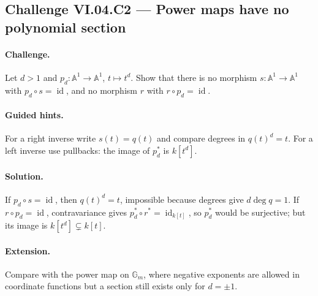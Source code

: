 \subsection*{Challenge VI.04.C2 --- Power maps have no polynomial section}
\label{chal:vi04-c2}
\paragraph{Challenge.}
Let \(d>1\) and \(p_d:\mathbb A^1\to\mathbb A^1\), \(t\mapsto t^d\).  Show that there is
no morphism \(s:\mathbb A^1\to\mathbb A^1\) with \(p_d\circ s=\operatorname{id}\), and no
morphism \(r\) with \(r\circ p_d=\operatorname{id}\).
\ifdefined\FullProblemDossiers
\paragraph{Guided hints.}  For a right inverse write \(s(t)=q(t)\) and compare degrees in
\(q(t)^d=t\).  For a left inverse use pullbacks: the image of \(p_d^*\) is \(k[t^d]\).
\paragraph{Solution.}
If \(p_d\circ s=\operatorname{id}\), then \(q(t)^d=t\), impossible because degrees give
\(d\deg q=1\).  If \(r\circ p_d=\operatorname{id}\), contravariance gives
\(p_d^*\circ r^*=\operatorname{id}_{k[t]}\), so \(p_d^*\) would be surjective; but its
image is \(k[t^d]\subsetneq k[t]\).
\paragraph{Extension.}  Compare with the power map on \(\mathbb G_m\), where negative
exponents are allowed in coordinate functions but a section still exists only for
\(d=\pm1\).
\fi
